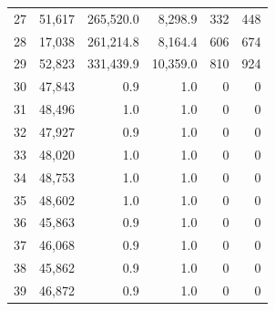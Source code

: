 {\begin{longtable}{rrrrrr}
27 & 51,617 & 265,520.0 & 8,298.9 & 332 & 448\\
28 & 17,038 & 261,214.8 & 8,164.4 & 606 & 674\\
29 & 52,823 & 331,439.9 & 10,359.0 & 810 & 924\\
30 & 47,843 & 0.9 & 1.0 & 0 & 0\\
31 & 48,496 & 1.0 & 1.0 & 0 & 0\\
32 & 47,927 & 0.9 & 1.0 & 0 & 0\\
33 & 48,020 & 1.0 & 1.0 & 0 & 0\\
34 & 48,753 & 1.0 & 1.0 & 0 & 0\\
35 & 48,602 & 1.0 & 1.0 & 0 & 0\\
36 & 45,863 & 0.9 & 1.0 & 0 & 0\\
37 & 46,068 & 0.9 & 1.0 & 0 & 0\\
38 & 45,862 & 0.9 & 1.0 & 0 & 0\\
39 & 46,872 & 0.9 & 1.0 & 0 & 0\\
\end{longtable}}
